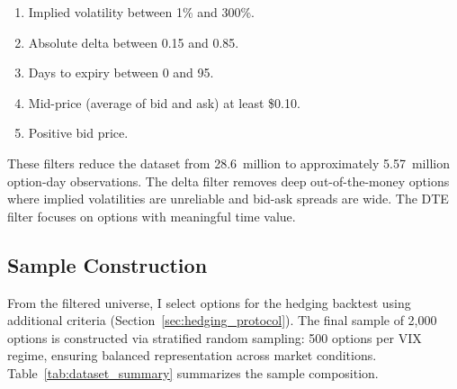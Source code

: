 \documentclass[12pt, letterpaper]{article}
\begin{document}
\begin{enumerate}
    \item Implied volatility between 1\% and 300\%.
    \item Absolute delta between 0.15 and 0.85.
    \item Days to expiry between 0 and 95.
    \item Mid-price (average of bid and ask) at least \$0.10.
    \item Positive bid price.
\end{enumerate}

These filters reduce the dataset from 28.6~million to approximately 5.57~million option-day observations. The delta filter removes deep out-of-the-money options where implied volatilities are unreliable and bid-ask spreads are wide. The DTE filter focuses on options with meaningful time value.

\subsection{Sample Construction}

From the filtered universe, I select options for the hedging backtest using additional criteria (Section~\ref{sec:hedging_protocol}). The final sample of 2,000 options is constructed via stratified random sampling: 500 options per VIX regime, ensuring balanced representation across market conditions. Table~\ref{tab:dataset_summary} summarizes the sample composition.
\end{document}
